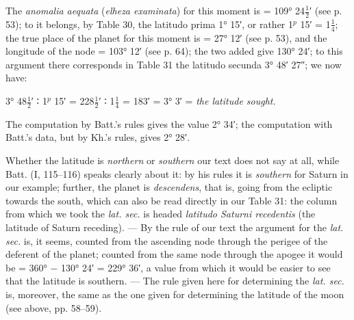 \documentclass[11pt]{article}
\newcommand{\Pg}[1]{\marginpar{\footnotesize\color{gray}#1}}
\begin{document}
\par The \emph{anomalia aequata} (\emph{elheza examinata}) for this moment is = 109° 24$\tfrac{1}{2}$′ (see p. 53); to it belongs, by Table 30, the latitudo prima 1° 15′, or rather 1$^{p}$ 15′ = 1$\tfrac{1}{4}$; the true place of the planet for this moment is = 27° 12′ (see p. 53), and the longitude of the node = 103° 12′ (see p. 64); the two added give 130° 24′; to this argument there corresponds in Table 31 the latitudo secunda 3° 48′ 27″; we now have:\par
\par\begin{center}3° 48$\tfrac{1}{2}$′ {\SignFont\upshape ∶} 1$^{p}$ 15′ = 228$\tfrac{1}{2}$′ {\SignFont\upshape ∶} 1$\tfrac{1}{4}$ = 183′ = 3° 3′ = \emph{the latitude sought.}\end{center}
\par \Pg{63}The computation by Batt.'s rules gives the value 2° 34′; the computation with Batt.'s data, but by Kh.'s rules, gives 2° 28′.\par
\par Whether the latitude is \emph{northern} or \emph{southern} our text does not say at all, while Batt. (I, 115–116) speaks clearly about it: by his rules it is \emph{southern} for Saturn in our example; further, the planet is \emph{descendens}, that is, going from the ecliptic towards the south, which can also be read directly in our Table 31: the column from which we took the \emph{lat. sec.} is headed \emph{latitudo Saturni recedentis} (the latitude of Saturn receding). — By the rule of our text the argument for the \emph{lat. sec.} is, it seems, counted from the ascending node through the perigee of the deferent of the planet; counted from the same node through the apogee it would be = 360° − 130° 24′ = 229° 36′, a value from which it would be easier to see that the latitude is southern. — The rule given here for determining the \emph{lat. sec.} is, moreover, the same as the one given for determining the latitude of the moon (see above, pp. 58–59).\par
\end{document}
